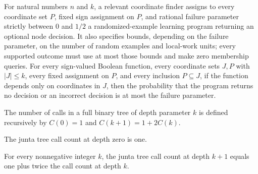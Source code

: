 \begin{definition}
\label{FABL.JuntaRelevantCoordinateFinder}
\leanok
{}
For natural numbers $n$ and $k$, a relevant coordinate finder assigns to every
coordinate set $P$, fixed sign assignment on $P$, and rational failure parameter
strictly between $0$ and $1/2$ a randomized-example learning program returning an
optional node decision. It also specifies bounds, depending on the failure parameter, on
the number of random examples and local-work units; every supported outcome must use at
most those bounds and make zero membership queries. For every sign-valued Boolean
function, every coordinate sets $J,P$ with $|J|\le k$, every fixed assignment on $P$,
and every inclusion $P\subseteq J$, if the function depends only on coordinates in $J$,
then the probability that the program returns no decision or an incorrect decision is at
most the failure parameter.
\end{definition}

\begin{definition}
\label{FABL.juntaTreeCallCount}
\leanok
The number of calls in a full binary tree of depth parameter $k$ is defined recursively
by $C(0)=1$ and $C(k+1)=1+2C(k)$.
\end{definition}

\begin{theorem}
\label{FABL.juntaTreeCallCount_zero}
\leanok
{}
The junta tree call count at depth zero is one.
\end{theorem}

\begin{theorem}
\label{FABL.juntaTreeCallCount_succ}
\leanok
{}
For every nonnegative integer $k$, the junta tree call count at depth $k+1$ equals one
plus twice the call count at depth $k$.
\end{theorem}

